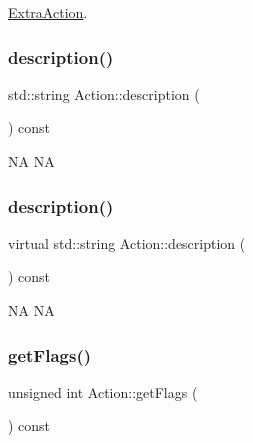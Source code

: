 \hyperlink{classExtraAction_a758a349952071ad00b74ddf34cfa9b2a}{Extra\+Action}.

\mbox{\label{classAction_ab593241dbcf25a8ac9160d6eb9d1c247}} 
\subsubsection{\texorpdfstring{description()}{description()}\hspace{0.1cm}{\footnotesize\ttfamily [1/2]}}
{\footnotesize\ttfamily std\+::string Action\+::description (\begin{DoxyParamCaption}{ }\end{DoxyParamCaption}) const\hspace{0.3cm}{\ttfamily [virtual]}}

NA  NA \mbox{\label{classAction_a8b9906b4513652f7b5ee0efc852848d4}} 
\subsubsection{\texorpdfstring{description()}{description()}\hspace{0.1cm}{\footnotesize\ttfamily [2/2]}}
{\footnotesize\ttfamily virtual std\+::string Action\+::description (\begin{DoxyParamCaption}{ }\end{DoxyParamCaption}) const\hspace{0.3cm}{\ttfamily [virtual]}}

NA  NA \mbox{\label{classAction_aabe5706c0cc66d461b14558728dccf01}} 
\subsubsection{\texorpdfstring{get\+Flags()}{getFlags()}\hspace{0.1cm}{\footnotesize\ttfamily [1/2]}}
{\footnotesize\ttfamily unsigned int Action\+::get\+Flags (\begin{DoxyParamCaption}{ }\end{DoxyParamCaption}) const\hspace{0.3cm}{\ttfamily [inline]}}

